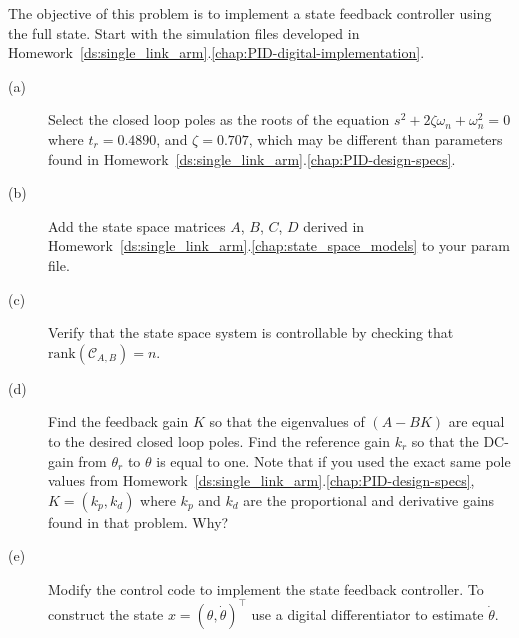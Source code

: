 
The objective of this problem is to implement a state feedback controller using the full state.
Start with the simulation files developed in Homework~\ref{ds:single_link_arm}.\ref{chap:PID-digital-implementation}.
\begin{description}
\item[(a)] Select the closed loop poles as the roots of the equation $s^2 + 2\zeta\omega_n + \omega_n^2 = 0$ where $t_r = 0.4890$, and $\zeta = 0.707$, which may be different than parameters found in Homework~\ref{ds:single_link_arm}.\ref{chap:PID-design-specs}.  
\item[(b)] Add the state space matrices $A$, $B$, $C$, $D$ derived in Homework~\ref{ds:single_link_arm}.\ref{chap:state_space_models} to your param file.
\item[(c)] Verify that the state space system is controllable by checking that $\text{rank}(\mathcal{C}_{A,B})=n$.
\item[(d)] Find the feedback gain $K$ so that the eigenvalues of $(A-BK)$ are equal to the desired closed loop poles.  Find the reference gain $k_r$ so that the DC-gain from $\theta_r$ to $\theta$ is equal to one.  Note that if you used the exact same pole values from Homework~\ref{ds:single_link_arm}.\ref{chap:PID-design-specs}, $K=(k_p, k_d)$ where $k_p$ and $k_d$ are the proportional and derivative gains found in that problem.  Why?
\item[(e)] Modify the control code to implement the state feedback controller.  To construct the state $x=(\theta, \dot{\theta})^{\top}$ use a digital differentiator to estimate $\dot{\theta}$.
\end{description}